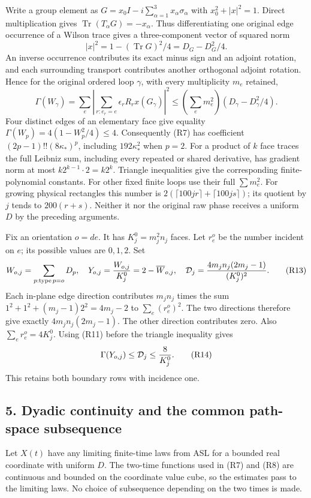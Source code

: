 \documentclass[11pt]{article}
\begin{document}
Write a group element as \(G=x_0I-i\sum_{\alpha=1}^3x_\alpha\sigma_\alpha\)
with \(x_0^2+|x|^2=1\). Direct multiplication gives
\(\operatorname{Tr}(T_\alpha G)=-x_\alpha\).
Thus differentiating one original edge occurrence of a Wilson trace
gives a three-component vector of squared norm
\[
 |x|^2=1-(\operatorname{Tr}G)^2/4=D_G-D_G^2/4.
 \tag{R11}
\]
An inverse occurrence contributes its exact minus sign and an adjoint
rotation, and each surrounding transport contributes another orthogonal
adjoint rotation. Hence for the original ordered loop \(\gamma\),
with every multiplicity \(m_e\) retained,
\[
 \Gamma(W_\gamma)=\sum_e\left|
   \sum_{r:e_r=e}\epsilon_r R_rx(G_\gamma)\right|^2
 \le\left(\sum_e m_e^2\right)
       (D_\gamma-D_\gamma^2/4).
 \tag{R12}
\]
Four distinct edges of an elementary face give equality
\(\Gamma(W_p)=4(1-W_p^2/4)\le4\).
Consequently (R7) has coefficient
\((2p-1)!!(8\kappa_*)^p\), including
\(192\kappa_*^2\) when \(p=2\).
For a product of \(k\) face traces the full Leibniz sum, including
every repeated or shared derivative, has gradient norm at most
\(k2^{k-1}\cdot2=k2^k\).
Triangle inequalities give the corresponding finite-polynomial constants.
For other fixed finite loops use their full \(\sum m_e^2\).
For growing physical rectangles this number is
\(2(\lceil100jr\rceil+\lceil100js\rceil)\);
its quotient by \(j\) tends to \(200(r+s)\).
Neither it nor the original raw phase receives a uniform \(D\)
by the preceding arguments.

Fix an orientation \(o=de\). It has \(K_j^0=m_j^2n_j\) faces.
Let \(r_e^o\) be the number incident on \(e\); its possible values
are \(0,1,2\). Set
\[
 W_{o,j}=\sum_{p:\operatorname{type}p=o}D_p,\quad
 Y_{o,j}={W_{o,j}\over K_j^0}=2-\overline W_{o,j},\quad
 \mathcal D_j={4m_jn_j(2m_j-1)\over(K_j^0)^2}.
 \tag{R13}
\]
Each in-plane edge direction contributes \(m_jn_j\) times the sum
\(1^2+1^2+(m_j-1)2^2=4m_j-2\) to \(\sum_e(r_e^o)^2\).
The two directions therefore give exactly
\(4m_jn_j(2m_j-1)\). The other direction contributes zero.
Also \(\sum_e r_e^o=4K_j^0\). Using (R11) before the triangle
inequality gives
\[
 \Gamma(Y_{o,j})\le\mathcal D_j\le{8\over K_j^0}.
 \tag{R14}
\]
This retains both boundary rows with incidence one.

\subsection*{5. Dyadic continuity and the common path-space subsequence}

Let \(X(t)\) have any limiting finite-time laws from ASL for a bounded
real coordinate with uniform \(D\). The two-time functions used in (R7)
and (R8) are continuous and bounded on the coordinate value cube,
so the estimates pass to the limiting laws. No choice of subsequence
depending on the two times is made.
\end{document}
